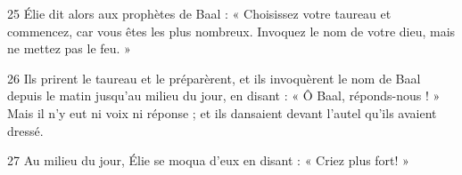 
25 Élie dit alors aux prophètes de Baal : « Choisissez votre taureau et commencez, car vous êtes les plus nombreux. Invoquez le nom de votre dieu, mais ne mettez pas le feu. »

26 Ils prirent le taureau et le préparèrent, et ils invoquèrent le nom de Baal depuis le matin jusqu’au milieu du jour, en disant : « Ô Baal, réponds-nous ! » Mais il n’y eut ni voix ni réponse ; et ils dansaient devant l’autel qu’ils avaient dressé.

27 Au milieu du jour, Élie se moqua d’eux en disant : « Criez plus fort! »
